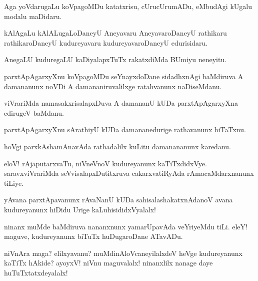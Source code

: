 \documentclass{article}
\begin{document}
\begin{mn}%
Aga yoVdarugaLu koVpagoMDu katatxrisu, cUrucUrumADu, eMbudAgi kUgalu modalu maDidaru.
\end{mn}

\begin{mn}%
kAlAgaLu kAlALugaLoDaneyU Aneyavaru AneyavaroDaneyU rathikaru rathikaroDaneyU kudureyavaru 
kudureyavaroDaneyU edurisidaru.
\end{mn}

\begin{mn}%
AnegaLU kuduregaLU kaDiyalapxTuTx rakatxdiMda BUmiyu neneyitu.
\end{mn}

\begin{mn}%
parxtApAgarxyXnu koVpagoMDu seYnayxdoDane sidadhxnAgi baMdiruva A damananunx noVDi A 
damananiruvalilxge ratahvanunx naDiseMdanu.
\end{mn}

\begin{mn}%
viVrariMda namasakxrisalapxDuva A damananU kUDa parxtApAgarxyXna edirugeV baMdanu.
\end{mn}

\begin{mn}%
parxtApAgarxyXnu sArathiyU kUDa damananedurige rathavanunx biTaTxnu.
\end{mn}

\begin{mn}%
hoVgi parxkAshamAnavAda rathadalilx kuLitu damanananunx karedanu.
\end{mn}

\begin{mn}%
eloV! rAjaputarxvaTu, niVneVnoV kudureyanunx kaTiTxdidxVye. saravxviVrariMda 
seVvisalapxDutitxruva cakarxvatiRyAda rAmacaMdarxnanunx tiLiye.
\end{mn}

\begin{mn}%
yAvana parxtApavanunx rAvaNanU kUDa sahisalashakatxnAdanoV avana kudureyanunx hiDidu Urige 
kaLuhisididxVyalalx!
\end{mn}

\begin{mn}%
ninanx muMde baMdiruva nananxnunx yamarUpavAda veYriyeMdu tiLi. eleY! maguve, kudureyanunx 
biTuTx huDugaroDane ATavADu.
\end{mn}

\begin{mn}%
niVnAra maga? elilxyavanu? muMdinAloVcaneyilalxdeV heVge kudureyanunx kaTiTx hAkide? 
ayoyxV! niVnu maguvalalx! ninanxlilx nanage daye huTuTxtatxdeyalalx!
\end{mn}
\end{document}
